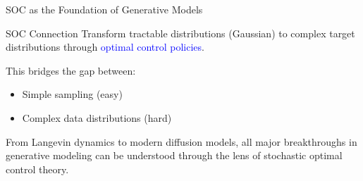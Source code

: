 \documentclass[aspectratio=169,xcolor=dvipsnames]{beamer}
\begin{document}
\begin{frame}{SOC as the Foundation of Generative Models}
    \vspace{-0.3cm}


        \begin{alertblock}{SOC Connection}
            Transform tractable distributions (Gaussian) to complex target distributions through \textcolor{blue}{optimal control policies}.
            
            \vspace{0.3cm}
            
            This bridges the gap between:
            \begin{itemize}
                \item Simple sampling (easy)
                \item Complex data distributions (hard)
            \end{itemize}

            From Langevin dynamics to modern diffusion models, all major breakthroughs in generative modeling can be understood through the lens of stochastic optimal control theory.

        \end{alertblock}
        
\end{frame}
\end{document}
